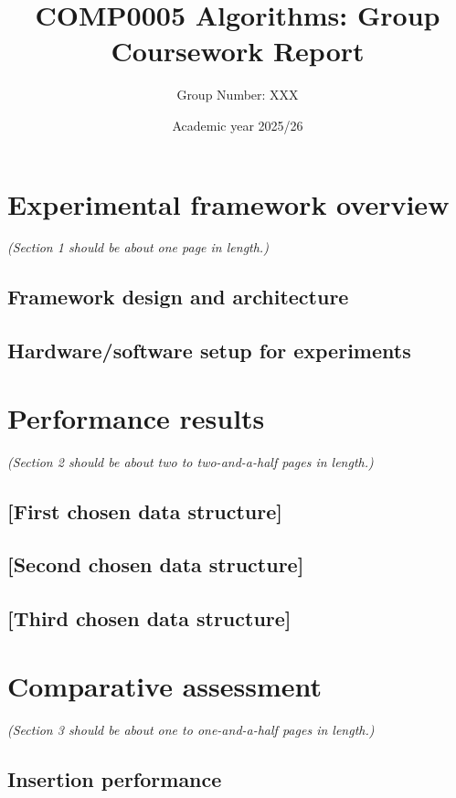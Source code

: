 \documentclass[12pt]{article}
\begin{document}
\title{COMP0005 Algorithms: Group Coursework Report}
\author{Group Number: XXX}
\date{Academic year 2025/26}
\maketitle



\section{Experimental framework overview}
\emph{(Section 1 should be about one page in length.)}

\subsection{Framework design and architecture}

\subsection{Hardware/software setup for experiments}




\section{Performance results}
\emph{(Section 2 should be about two to two-and-a-half pages in length.)}

\subsection{[First chosen data structure]}

\subsection{[Second chosen data structure]}

\subsection{[Third chosen data structure]}




\section{Comparative assessment}
\emph{(Section 3 should be about one to one-and-a-half pages in length.)}

\subsection*{Insertion performance}
\end{document}
